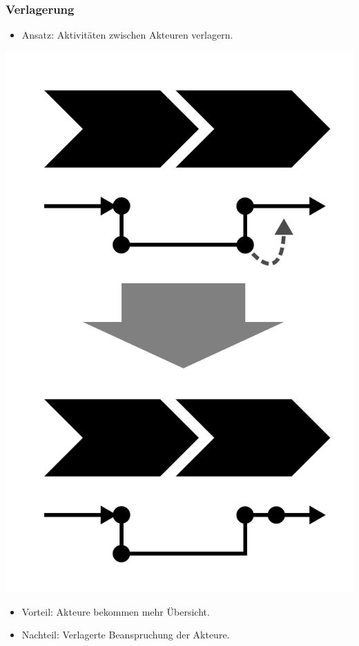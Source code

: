 \documentclass{beamer}
\begin{document}
 \begin{frame}
  \frametitle{Verlagerung}
    \begin{itemize}
    \item Ansatz: Aktivitäten zwischen Akteuren verlagern.
  \end{itemize}
  \centerline{\includegraphics[scale=2.5]{4_6_5.png}}
  \begin{itemize}
    \item Vorteil: Akteure bekommen mehr Übersicht.
    \item Nachteil: Verlagerte Beanspruchung der Akteure.
  \end{itemize}
 \end{frame}
\end{document}
